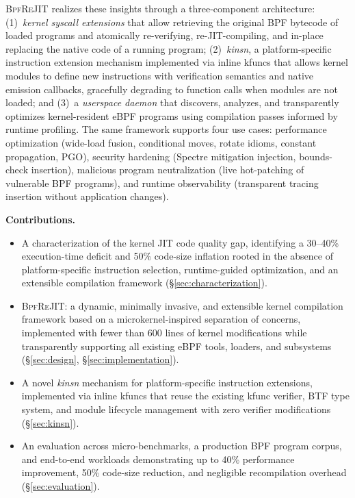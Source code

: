 \documentclass[sigconf,anonymous]{acmart}
\begin{document}
\textsc{BpfReJIT} realizes these insights through a three-component
architecture: (1)~\emph{kernel syscall extensions} that allow
retrieving the original BPF bytecode of loaded programs and
atomically re-verifying, re-JIT-compiling, and in-place replacing the
native code of a running program; (2)~\emph{kinsn}, a platform-specific
instruction extension mechanism implemented via inline kfuncs that
allows kernel modules to define new instructions with verification
semantics and native emission callbacks, gracefully degrading to
function calls when modules are not loaded; and (3)~a \emph{userspace
daemon} that discovers, analyzes, and transparently optimizes
kernel-resident eBPF programs using compilation passes informed by
runtime profiling. The same framework supports four use cases:
performance optimization (wide-load fusion, conditional moves, rotate
idioms, constant propagation, PGO), security hardening (Spectre
mitigation injection, bounds-check insertion), malicious program
neutralization (live hot-patching of vulnerable BPF programs), and
runtime observability (transparent tracing insertion without
application changes).

\textbf{Contributions.}
\begin{itemize}
  \item A characterization of the kernel JIT code quality gap,
    identifying a 30--40\% execution-time deficit and 50\% code-size
    inflation rooted in the absence of platform-specific instruction
    selection, runtime-guided optimization, and an extensible
    compilation framework (\S\ref{sec:characterization}).
  \item \textsc{BpfReJIT}: a dynamic, minimally invasive, and
    extensible kernel compilation framework based on a
    microkernel-inspired separation of concerns, implemented with
    fewer than 600 lines of kernel modifications while transparently
    supporting all existing eBPF tools, loaders, and subsystems
    (\S\ref{sec:design}, \S\ref{sec:implementation}).
  \item A novel \emph{kinsn} mechanism for platform-specific
    instruction extensions, implemented via inline kfuncs that reuse
    the existing kfunc verifier, BTF type system, and module
    lifecycle management with zero verifier modifications
    (\S\ref{sec:kinsn}).
  \item An evaluation across micro-benchmarks, a production BPF
    program corpus, and end-to-end workloads demonstrating up to 40\%
    performance improvement, 50\% code-size reduction, and negligible
    recompilation overhead (\S\ref{sec:evaluation}).
\end{itemize}
\end{document}
